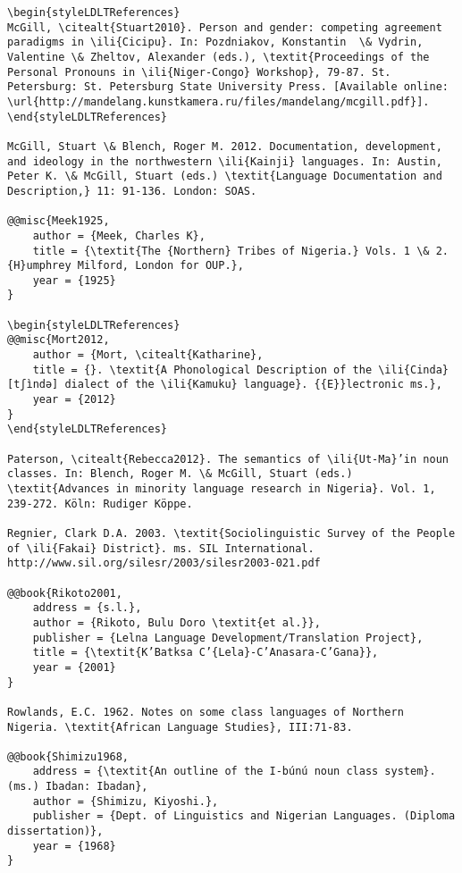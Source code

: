 \documentclass[output=paper]{langsci/langscibook}
\begin{document}
\begin{verbatim}
\begin{styleLDLTReferences}
McGill, \citealt{Stuart2010}. Person and gender: competing agreement paradigms in \ili{Cicipu}. In: Pozdniakov, Konstantin  \& Vydrin, Valentine \& Zheltov, Alexander (eds.), \textit{Proceedings of the Personal Pronouns in \ili{Niger-Congo} Workshop}, 79-87. St. Petersburg: St. Petersburg State University Press. [Available online: \url{http://mandelang.kunstkamera.ru/files/mandelang/mcgill.pdf}].
\end{styleLDLTReferences}

McGill, Stuart \& Blench, Roger M. 2012. Documentation, development, and ideology in the northwestern \ili{Kainji} languages. In: Austin, Peter K. \& McGill, Stuart (eds.) \textit{Language Documentation and Description,} 11: 91-136. London: SOAS.

@@misc{Meek1925,
	author = {Meek, Charles K},
	title = {\textit{The {Northern} Tribes of Nigeria.} Vols. 1 \& 2. {H}umphrey Milford, London for OUP.},
	year = {1925}
}

\begin{styleLDLTReferences}
@@misc{Mort2012,
	author = {Mort, \citealt{Katharine},
	title = {}. \textit{A Phonological Description of the \ili{Cinda} [tʃìndə] dialect of the \ili{Kamuku} language}. {{E}}lectronic ms.},
	year = {2012}
}
\end{styleLDLTReferences}

Paterson, \citealt{Rebecca2012}. The semantics of \ili{Ut-Ma}’in noun classes. In: Blench, Roger M. \& McGill, Stuart (eds.) \textit{Advances in minority language research in Nigeria}. Vol. 1, 239-272. Köln: Rudiger Köppe.

Regnier, Clark D.A. 2003. \textit{Sociolinguistic Survey of the People of \ili{Fakai} District}. ms. SIL International. http://www.sil.org/silesr/2003/silesr2003-021.pdf

@@book{Rikoto2001,
	address = {s.l.},
	author = {Rikoto, Bulu Doro \textit{et al.}},
	publisher = {Lelna Language Development/Translation Project},
	title = {\textit{K’Batksa C’{Lela}-C’Anasara-C’Gana}},
	year = {2001}
}

Rowlands, E.C. 1962. Notes on some class languages of Northern Nigeria. \textit{African Language Studies}, III:71-83.

@@book{Shimizu1968,
	address = {\textit{An outline of the I-búnú noun class system}.(ms.) Ibadan: Ibadan},
	author = {Shimizu, Kiyoshi.},
	publisher = {Dept. of Linguistics and Nigerian Languages. (Diploma dissertation)},
	year = {1968}
}


\end{verbatim}
\end{document}

